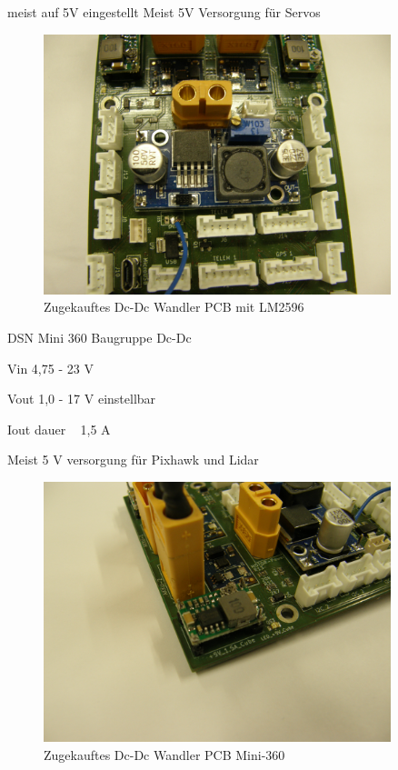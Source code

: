 meist auf 5V  eingestellt 
Meist 5V Versorgung für Servos

\begin{figure}[H]
\centering
\includegraphics[width=0.9\textwidth]{bilder/Zukaufbauteile/Baugruppen_Dc-Dc_LM2596S.jpg} 
\caption{Zugekauftes Dc-Dc Wandler PCB mit LM2596} 
\label{fig:Zugekauftes Dc-Dc Wandler PCB mit LM2596}
\end{figure}


DSN Mini 360  Baugruppe Dc-Dc

Vin 4,75 - 23 V

Vout 1,0 - 17 V einstellbar

Iout dauer  ~ 1,5 A

Meist 5 V versorgung für Pixhawk und Lidar

\begin{figure}[H]
\centering
\includegraphics[width=0.9\textwidth]{bilder/Zukaufbauteile/Baugruppen_Dc-Dc_Mini-360.jpg} 
\caption{Zugekauftes Dc-Dc Wandler PCB Mini-360} 
\label{fig:Zugekauftes Dc-Dc Wandler PCB Mini-360}
\end{figure}

